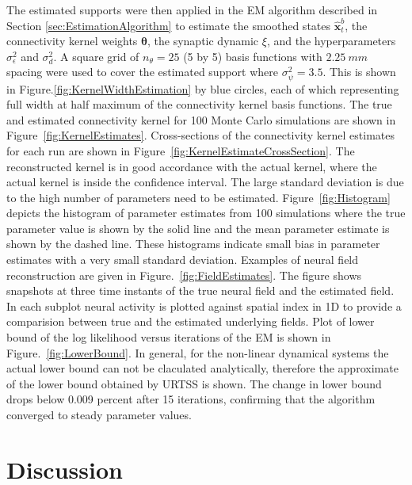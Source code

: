\documentclass[]{article}
\begin{document}
The estimated supports were then applied in the EM algorithm described in Section \ref{sec:EstimationAlgorithm} to estimate the smoothed states $\hat{\mathbf x}_t^b$, the connectivity kernel weights $\boldsymbol\theta$, the synaptic dynamic $\xi$, and the hyperparameters $\sigma_{\epsilon}^2$ and $\sigma^2_d$. A  square grid of $n_{\theta}=25$ (5 by 5) basis functions with $2.25~mm$ spacing were used to cover the estimated support where $\sigma_{\psi}^2=3.5$. This is shown in Figure.\ref{fig:KernelWidthEstimation} by blue circles, each of which representing full width at half maximum of the connectivity kernel basis functions. The true and estimated connectivity kernel for 100 Monte Carlo simulations are shown in Figure~\ref{fig:KernelEstimates}. Cross-sections of the connectivity kernel estimates for each run are shown in Figure~\ref{fig:KernelEstimateCrossSection}. The reconstructed kernel is in good accordance with the actual kernel, where the actual kernel is inside the confidence interval. The large standard deviation is due to the high number of parameters need to be estimated. Figure~\ref{fig:Histogram} depicts the histogram of parameter estimates from 100 simulations where the true parameter value is shown by the solid line and the mean parameter estimate is shown by the dashed line. These histograms indicate small bias in parameter estimates with a very small standard deviation. Examples of neural field reconstruction are given in Figure.~\ref{fig:FieldEstimates}.  The figure shows snapshots at three time instants of the true neural field and the estimated field. In each subplot neural activity is plotted against spatial index in 1D to provide a comparision between true and the estimated underlying fields. Plot of lower bound of the log likelihood versus iterations of the EM is shown in Figure.~\ref{fig:LowerBound}. In general, for the non-linear dynamical systems the actual lower bound can not be claculated analytically, therefore the approximate of the lower bound obtained by URTSS is shown. The change in lower bound drops below 0.009 percent after 15 iterations, confirming
that the algorithm converged to steady parameter values.
\section{Discussion}
\end{document}

